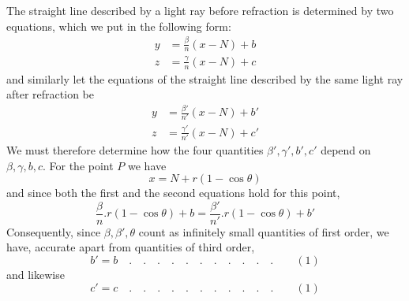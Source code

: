 The straight line described by a light ray before refraction is determined by two equations, which we put in the following form:
\[
\begin{aligned}
y&=\frac\beta n(x-N)+b\\
z&=\frac\gamma n(x-N)+c
\end{aligned}
\]
and similarly let the equations of the straight line described by the same light ray after refraction be
\[
\begin{aligned}
y&=\frac{\beta'}{n'}(x-N)+b'\\
z&=\frac{\gamma'}{n'}(x-N)+c'
\end{aligned}
\]
We must therefore determine how the four quantities $\beta',\gamma',b',c'$ depend on $\beta,\gamma,b,c$. For the point $P$ we have
\[
x=N+r(1-\cos\theta)
\]
and since both the first and the second equations hold for this point,
\[
\frac\beta n.r(1-\cos\theta)+b=\frac{\beta'}{n'}.r(1-\cos\theta)+b'
\]
Consequently, since $\beta,\beta',\theta$ count as infinitely small quantities of first order, we have, accurate apart from quantities of third order,
\[
b'=b\quad .\quad .\quad .\quad .\quad .\quad .\quad .\quad .\quad .\quad .\quad .\qquad(1)
\]
and likewise
\[
c'=c\quad .\quad .\quad .\quad .\quad .\quad .\quad .\quad .\quad .\quad .\quad .\qquad(1)
\]

